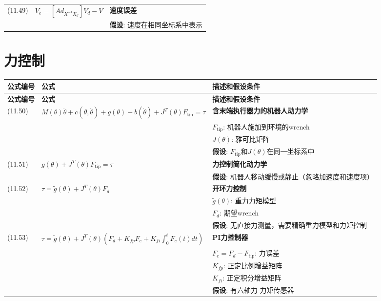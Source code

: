 \documentclass[12pt,a4paper]{article}
\begin{document}
\begin{longtable}{|p{}|p{}|p{}|}
(11.49) & $V_e = [Ad_{X^{-1}X_d}]V_d - V$ & 
\textbf{速度误差} \\
& & \textbf{假设}: 速度在相同坐标系中表示 \\
\hline

\end{longtable}

\section{力控制}

\begin{longtable}{|p{}|p{}|p{}|}
\hline
\textbf{公式编号} & \textbf{公式} & \textbf{描述和假设条件} \\
\hline
\endfirsthead
\hline
\textbf{公式编号} & \textbf{公式} & \textbf{描述和假设条件} \\
\hline
\endhead
\hline
\endfoot
\hline
\endlastfoot

(11.50) & $M(\theta)\ddot{\theta} + c(\theta, \dot{\theta}) + g(\theta) + b(\dot{\theta}) + J^T(\theta)F_{\text{tip}} = \tau$ & 
\textbf{含末端执行器力的机器人动力学} \\
& & $F_{\text{tip}}$: 机器人施加到环境的wrench \\
& & $J(\theta)$: 雅可比矩阵 \\
& & \textbf{假设}: $F_{\text{tip}}$和$J(\theta)$在同一坐标系中 \\
\hline

(11.51) & $g(\theta) + J^T(\theta)F_{\text{tip}} = \tau$ & 
\textbf{力控制简化动力学} \\
& & \textbf{假设}: 机器人移动缓慢或静止（忽略加速度和速度项） \\
\hline

(11.52) & $\tau = \tilde{g}(\theta) + J^T(\theta)F_d$ & 
\textbf{开环力控制} \\
& & $\tilde{g}(\theta)$: 重力力矩模型 \\
& & $F_d$: 期望wrench \\
& & \textbf{假设}: 无直接力测量，需要精确重力模型和力矩控制 \\
\hline

(11.53) & $\tau = \tilde{g}(\theta) + J^T(\theta)\left(F_d + K_{fp}F_e + K_{fi}\int_0^t F_e(t)dt\right)$ & 
\textbf{PI力控制器} \\
& & $F_e = F_d - F_{\text{tip}}$: 力误差 \\
& & $K_{fp}$: 正定比例增益矩阵 \\
& & $K_{fi}$: 正定积分增益矩阵 \\
& & \textbf{假设}: 有六轴力-力矩传感器 \\
\hline


\end{longtable}
\end{document}
